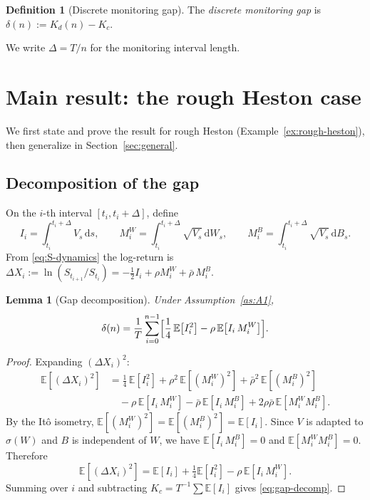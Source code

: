 \documentclass[12pt]{article}
\newtheorem{lemma}[theorem]{Lemma}
\theoremstyle{definition}
\newtheorem{definition}[theorem]{Definition}
\newcommand{\E}{\mathbb{E}}
\newcommand{\dd}{\mathrm{d}}
\begin{document}
\begin{definition}[Discrete monitoring gap]\label{def:gap}
The \emph{discrete monitoring gap} is
$\delta(n) := K_d(n) - K_c$.
\end{definition}

We write $\Delta = T/n$ for the monitoring interval length.

\section{Main result: the rough Heston case}\label{sec:main-rh}

We first state and prove the result for rough Heston
(Example~\ref{ex:rough-heston}), then generalize in
Section~\ref{sec:general}.

\subsection{Decomposition of the gap}

On the $i$-th interval $[t_i, t_i{+}\Delta]$, define
\begin{equation}\label{eq:Ii-Mi}
  I_i = \int_{t_i}^{t_i+\Delta}\! V_s\,\dd s,
  \qquad
  M_i^W = \int_{t_i}^{t_i+\Delta}\! \sqrt{V_s}\,\dd W_s,
  \qquad
  M_i^B = \int_{t_i}^{t_i+\Delta}\! \sqrt{V_s}\,\dd B_s.
\end{equation}
From \eqref{eq:S-dynamics} the log-return is
$\Delta X_i := \ln(S_{t_{i+1}}/S_{t_i})
= -\tfrac12 I_i + \rho M_i^W + \bar\rho\, M_i^B$.

\begin{lemma}[Gap decomposition]\label{lem:gap-decomp}
Under Assumption~\ref{as:A1},
\begin{equation}\label{eq:gap-decomp}
  \delta(n)
  = \frac{1}{T}\sum_{i=0}^{n-1}
  \Bigl[\frac{1}{4}\,\E\bigl[I_i^2\bigr]
  - \rho\,\E\bigl[I_i\, M_i^W\bigr]\Bigr].
\end{equation}
\end{lemma}

\begin{proof}
Expanding $(\Delta X_i)^2$:
\begin{align*}
  \E[(\Delta X_i)^2]
  &= \tfrac14\,\E[I_i^2]
    + \rho^2\,\E[(M_i^W)^2]
    + \bar\rho^2\,\E[(M_i^B)^2] \\
  &\quad
    - \rho\,\E[I_i\,M_i^W]
    - \bar\rho\,\E[I_i\,M_i^B]
    + 2\rho\bar\rho\,\E[M_i^W M_i^B].
\end{align*}
By the It\^o isometry,
$\E[(M_i^W)^2] = \E[(M_i^B)^2] = \E[I_i]$.
Since $V$ is adapted to $\sigma(W)$ and $B$ is independent of $W$,
we have $\E[I_i\, M_i^B] = 0$ and $\E[M_i^W M_i^B] = 0$.
Therefore
\[
  \E[(\Delta X_i)^2]
  = \E[I_i] + \tfrac14 \E[I_i^2] - \rho\,\E[I_i\, M_i^W].
\]
Summing over $i$ and subtracting $K_c = T^{-1}\sum \E[I_i]$ gives
\eqref{eq:gap-decomp}.
\end{proof}
\end{document}
